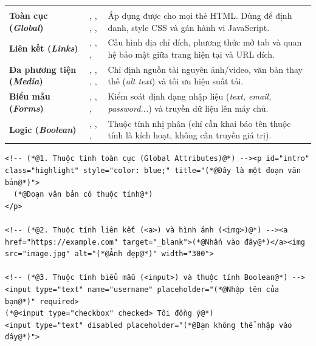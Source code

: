 \begin{prettyTableBox}
\begin{tabularx}{\linewidth}{>{\bfseries\color{primaryBlue}}p{3.0cm} p{3.8cm} Z}
 &  &  \\
Toàn cục (\textit{Global}) & , , , ,  & Áp dụng được cho mọi thẻ HTML. Dùng để định danh, style CSS và gán hành vi JavaScript. \\
Liên kết (\textit{Links}) & , , ,  & Cấu hình địa chỉ đích, phương thức mở tab và quan hệ bảo mật giữa trang hiện tại và URL đích. \\
Đa phương tiện (\textit{Media}) & , , , ,  & Chỉ định nguồn tài nguyên ảnh/video, văn bản thay thế (\textit{alt text}) và tối ưu hiệu suất tải. \\
Biểu mẫu (\textit{Forms}) & , , ,  & Kiểm soát định dạng nhập liệu (\textit{text, email, password...}) và truyền dữ liệu lên máy chủ. \\
Logic (\textit{Boolean}) & , , ,  & Thuộc tính nhị phân (chỉ cần khai báo tên thuộc tính là kích hoạt, không cần truyền giá trị). \\
\end{tabularx}
\end{prettyTableBox}

\begin{codeWindow}
\begin{lstlisting}[language=HTML5]
<!-- (*@1. Thuộc tính toàn cục (Global Attributes)@*) --><p id="intro" class="highlight" style="color: blue;" title="(*@Đây là một đoạn văn bản@*)">
  (*@Đoạn văn bản có thuộc tính@*)
</p>

<!-- (*@2. Thuộc tính liên kết (<a>) và hình ảnh (<img>)@*) --><a href="https://example.com" target="_blank">(*@Nhấn vào đây@*)</a><img src="image.jpg" alt="(*@Ảnh đẹp@*)" width="300">

<!-- (*@3. Thuộc tính biểu mẫu (<input>) và thuộc tính Boolean@*) --><input type="text" name="username" placeholder="(*@Nhập tên của bạn@*)" required>
(*@<input type="checkbox" checked> Tôi đồng ý@*)
<input type="text" disabled placeholder="(*@Bạn không thể nhập vào đây@*)">
\end{lstlisting}
\end{codeWindow}

